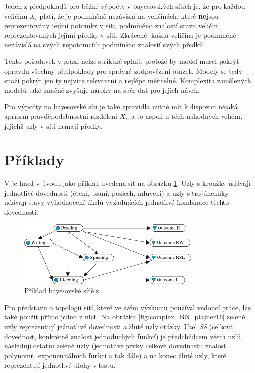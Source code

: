 \documentclass[a4paper,twoside,12pt]{book}
\begin{document}
Jeden z předpokladů pro běžné výpočty v bayesovských sítích je, že pro každou veličinu $X_i$ platí, že je podmíněně nezávislá na veličinách, které  \textbf{ne}jsou reprezentovány jejími potomky v síti, podmíněno znalostí stavu veličin reprezentovaných jejími předky v síti. Zkráceně: každá veličina je podmíněně nezávislá na svých nepotomcích podmíněno znalostí svých předků.

Tento požadavek v praxi nelze striktně splnit, protože by model musel pokrýt opravdu všechny předpoklady pro správné zodpovězení otázek. Modely se tedy snaží pokrýt jen ty nejvíce relevantní a nejlépe měřitelné. Komplexita zamšlených modelů také značně zvyšuje nároky na sběr dat pro jejich návrh.

Pro výpočty na bayesovské síti je také zpravidla nutné mít k dispozici nějaká apriorní pravděpodobnostní rozdělení $X_i$, a to aspoň u těch náhodných veličin, jejichž uzly v síti nemají předky.

\section{Příklady}
\label{sec:net_examples}
V \cite{almond_tlustospis} je hned v úvodu jako příklad uvedena síť na obrázku \ref{fig:almond_BN_example}. Uzly s kroužky udávají jednotlivé dovednosti (čtení, psaní, poslech, mluvení) a uzly s trojúhelníky udávají stavy vyhodnocení úkolů vyžadujících jednotlivé kombinace těchto dovedností.

\begin{figure}
  \centering
    \includegraphics[width=0.8\textwidth]{almond_BN_example.pdf}
  \caption{Příklad bayesovské síťě z \cite{almond_tlustospis}.}
  \label{fig:almond_BN_example}
\end{figure}

Pro představu o topologii sítí, které ve svém výzkumu používal vedoucí práce, lze také použít přímo jednu z nich. Na obrázku \ref{fig:complex_BN_plajner16} zelené uzly reprezentují jednotlivé dovednosti a žluté uzly otázky. Uzel \emph{S8} (celková dovednost, konkrétně znalost jednoduchých funkcí) je předchůdcem všech uzlů, následují ostatní zelené uzly (jednotlivé prvky celkové dovednosti: znalost polynomů, exponenciálních funkcí a tak dále) a na konec žluté uzly, které reprezentují jednotlivé úlohy v testu.
\end{document}
